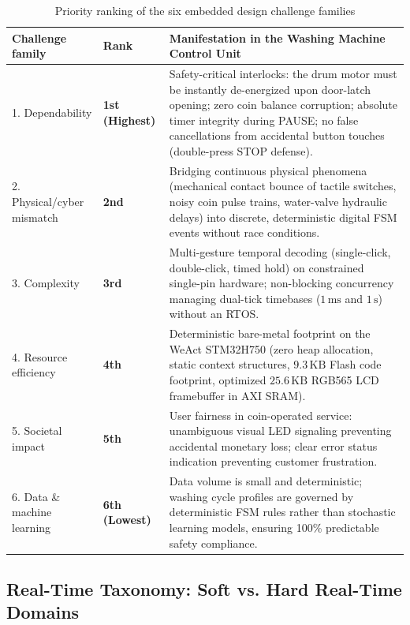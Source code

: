 \begin{table}[H]
  \centering
  \caption{Priority ranking of the six embedded design challenge families}
  \label{tab:six}
  \small
  \renewcommand{\arraystretch}{1.2}
  \begin{tabularx}{\linewidth}{L{4.4cm} C{2.2cm} Y}
    \toprule
    \textbf{Challenge family} & \textbf{Rank} & \textbf{Manifestation in the Washing Machine Control Unit} \\
    . Dependability & \textbf{1st (Highest)} & 
      Safety-critical interlocks: the drum motor must be instantly de-energized upon door-latch opening;
      zero coin balance corruption; absolute timer integrity during PAUSE; no false cancellations from
      accidental button touches (double-press STOP defense). \\
    2. Physical/cyber mismatch & \textbf{2nd} & 
      Bridging continuous physical phenomena (mechanical contact bounce of tactile switches, noisy coin pulse trains,
      water-valve hydraulic delays) into discrete, deterministic digital FSM events without race conditions. \\
    3. Complexity & \textbf{3rd} & 
      Multi-gesture temporal decoding (single-click, double-click, timed hold) on constrained single-pin hardware;
      non-blocking concurrency managing dual-tick timebases ($1\,\text{ms}$ and $1\,\text{s}$) without an RTOS. \\
    4. Resource efficiency & \textbf{4th} & 
      Deterministic bare-metal footprint on the WeAct STM32H750 (zero heap allocation, static context structures,
      $9.3\,\text{KB}$ Flash code footprint, optimized $25.6\,\text{KB}$ RGB565 LCD framebuffer in AXI SRAM). \\
    5. Societal impact & \textbf{5th} & 
      User fairness in coin-operated service: unambiguous visual LED signaling preventing accidental monetary loss;
      clear error status indication preventing customer frustration. \\
    6. Data \& machine learning & \textbf{6th (Lowest)} & 
      Data volume is small and deterministic; washing cycle profiles are governed by deterministic FSM rules
      rather than stochastic learning models, ensuring 100\% predictable safety compliance. \\
    \bottomrule
  \end{tabularx}
\end{table}

\subsection{Real-Time Taxonomy: Soft vs. Hard Real-Time Domains}
\label{sec:realtime}

